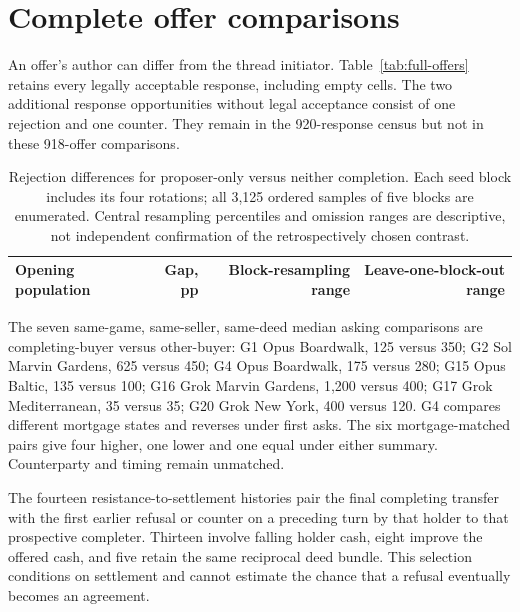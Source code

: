 \section{Complete offer comparisons}
\label{app:comparisons}
An offer's author can differ from the thread initiator. Table~\ref{tab:full-offers} retains every legally acceptable response, including empty cells. The two additional response opportunities without legal acceptance consist of one rejection and one counter. They remain in the 920-response census but not in these 918-offer comparisons.


\begin{table}[ht]\centering\small
\begin{tabular}{@{}lrrr@{}}\toprule
Opening population & Gap, pp & Block-resampling range & Leave-one-block-out range\\\midrule

\end{tabular}
\caption{Rejection differences for proposer-only versus neither completion. Each seed block includes its four rotations; all 3,125 ordered samples of five blocks are enumerated. Central resampling percentiles and omission ranges are descriptive, not independent confirmation of the retrospectively chosen contrast.}
\end{table}

The seven same-game, same-seller, same-deed median asking comparisons are completing-buyer versus other-buyer: G1 Opus Boardwalk, 125 versus 350; G2 Sol Marvin Gardens, 625 versus 450; G4 Opus Boardwalk, 175 versus 280; G15 Opus Baltic, 135 versus 100; G16 Grok Marvin Gardens, 1,200 versus 400; G17 Grok Mediterranean, 35 versus 35; G20 Grok New York, 400 versus 120. G4 compares different mortgage states and reverses under first asks. The six mortgage-matched pairs give four higher, one lower and one equal under either summary. Counterparty and timing remain unmatched.

The fourteen resistance-to-settlement histories pair the final completing transfer with the first earlier refusal or counter on a preceding turn by that holder to that prospective completer. Thirteen involve falling holder cash, eight improve the offered cash, and five retain the same reciprocal deed bundle. This selection conditions on settlement and cannot estimate the chance that a refusal eventually becomes an agreement.

